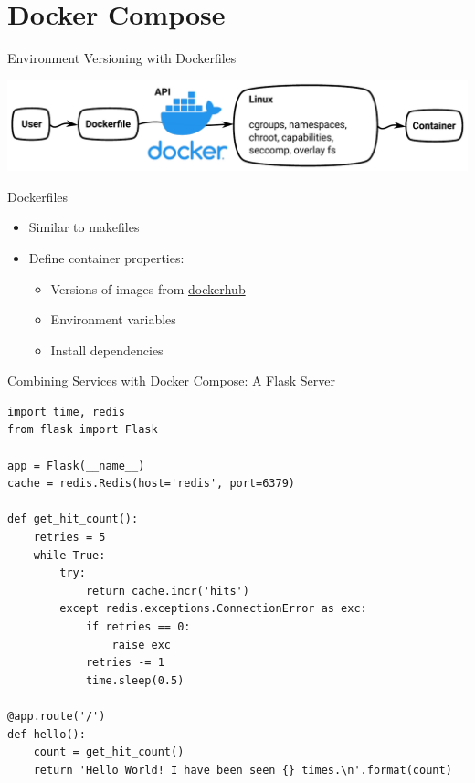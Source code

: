 \documentclass[10pt, compress, aspectratio=169, xcolor={table,usenames,dvipsnames}]{beamer}
\begin{document}
\section{Docker Compose}
\label{sec:orgaf67c72}
\begin{frame}[label={sec:org497644d}]{Environment Versioning with Dockerfiles}
\begin{center}
\includegraphics[width=.78\columnwidth]{../../img/virt_with_dockerfile.pdf}
\end{center}
\begin{block}{Dockerfiles}
\begin{itemize}
\item Similar to \alert{makefiles}
\item Define container \alert{properties}:
\begin{itemize}
\item Versions of images from \href{https://hub.docker.com/search?q=\&type=image}{dockerhub}
\item Environment variables
\item Install dependencies
\end{itemize}
\end{itemize}
\end{block}
\end{frame}
\begin{frame}[label={sec:orgf74fbe5},fragile]{Combining Services with Docker Compose: A Flask Server}
 \lstset{language=Python,label= ,caption= ,captionpos=b,numbers=none}
\begin{lstlisting}
import time, redis
from flask import Flask

app = Flask(__name__)
cache = redis.Redis(host='redis', port=6379)

def get_hit_count():
    retries = 5
    while True:
        try:
            return cache.incr('hits')
        except redis.exceptions.ConnectionError as exc:
            if retries == 0:
                raise exc
            retries -= 1
            time.sleep(0.5)

@app.route('/')
def hello():
    count = get_hit_count()
    return 'Hello World! I have been seen {} times.\n'.format(count)
\end{lstlisting}
\end{frame}
\end{document}
